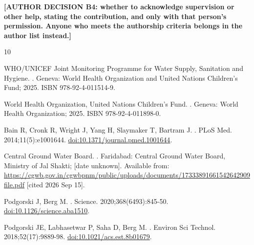 \documentclass[10pt,letterpaper]{article}
\begin{document}
\textbf{[AUTHOR DECISION B4: whether to acknowledge supervision or other help, stating the contribution, and only with that person's permission. Anyone who meets the authorship criteria belongs in the author list instead.]}

\nolinenumbers

\begin{thebibliography}{10}

{WHO/UNICEF Joint Monitoring Programme for Water Supply, Sanitation and
  Hygiene}.
.
\newblock Geneva: World Health Organization and United Nations Children's Fund;
  2025.
\newblock ISBN 978-92-4-011514-9.

{World Health Organization}, {United Nations Children's Fund}.
.
\newblock Geneva: World Health Organization; 2025.
\newblock ISBN 978-92-4-011898-0.

{Bain} R, {Cronk} R, {Wright} J, {Yang} H, {Slaymaker} T, {Bartram} J.
.
\newblock PLoS Med. 2014;11(5):e1001644.
\newblock \href {http://dx.doi.org/10.1371/journal.pmed.1001644}
  {doi:10.1371/journal.pmed.1001644}.

{Central Ground Water Board}.
.
\newblock Faridabad: Central Ground Water Board, Ministry of Jal Shakti; [date
  unknown].
\newblock Available from:
  \url{https://cgwb.gov.in/cgwbpnm/public/uploads/documents/17333891661542642909file.pdf}
  [cited 2026 Sep 15].

{Podgorski} J, {Berg} M.
.
\newblock Science. 2020;368(6493):845-50.
\newblock \href {http://dx.doi.org/10.1126/science.aba1510}
  {doi:10.1126/science.aba1510}.

{Podgorski} JE, {Labhasetwar} P, {Saha} D, {Berg} M.
.
\newblock Environ Sci Technol. 2018;52(17):9889-98.
\newblock \href {http://dx.doi.org/10.1021/acs.est.8b01679}
  {doi:10.1021/acs.est.8b01679}.


\end{thebibliography}
\end{document}

